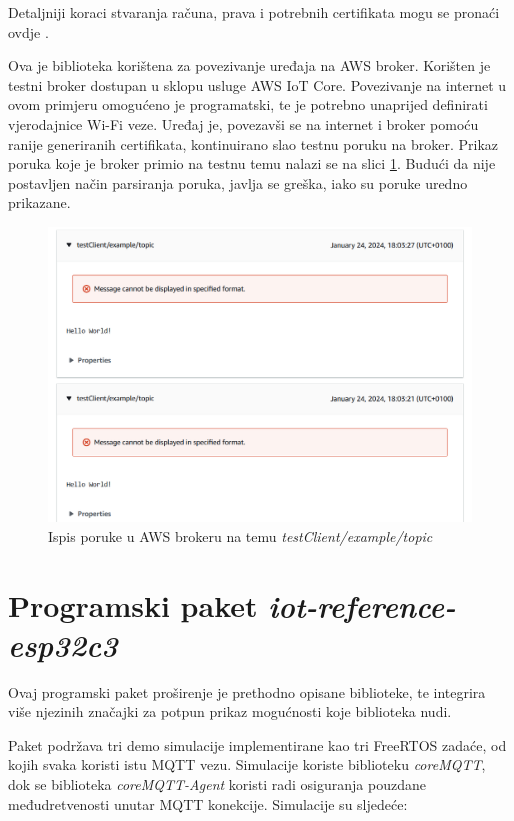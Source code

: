 Detaljniji koraci stvaranja računa, prava i potrebnih certifikata mogu se pronaći ovdje \cite{setup_aws}.

Ova je biblioteka korištena za povezivanje uređaja na AWS broker. Korišten je testni broker dostupan u sklopu usluge AWS IoT Core. Povezivanje na internet u ovom primjeru omogućeno je programatski, te je potrebno unaprijed definirati vjerodajnice Wi-Fi veze. Uređaj je, povezavši se na internet i broker pomoću ranije generiranih certifikata, kontinuirano slao testnu poruku na broker. Prikaz poruka koje je broker primio na testnu temu nalazi se na slici \ref{fig:testClient_helloworld}. Budući da nije postavljen način parsiranja poruka, javlja se greška, iako su poruke uredno prikazane.

\begin{figure}[ht]
	\centering
	\includegraphics[scale=0.5]{imgs/testClient_helloworld}
	\caption{Ispis poruke u AWS brokeru na temu \textit{testClient/example/topic}}
	\label{fig:testClient_helloworld}
\end{figure}

\section{Programski paket \textit{iot-reference-esp32c3}} 

Ovaj programski paket \cite{iot-reference-esp32-c3} proširenje je prethodno opisane biblioteke, te integrira više njezinih značajki za potpun prikaz mogućnosti koje biblioteka nudi. 

Paket podržava tri demo simulacije implementirane kao tri FreeRTOS zadaće, od kojih svaka koristi istu MQTT vezu. Simulacije koriste biblioteku \textit{coreMQTT}, dok se biblioteka \textit{coreMQTT-Agent} koristi radi osiguranja pouzdane međudretvenosti unutar MQTT konekcije. Simulacije su sljedeće:

